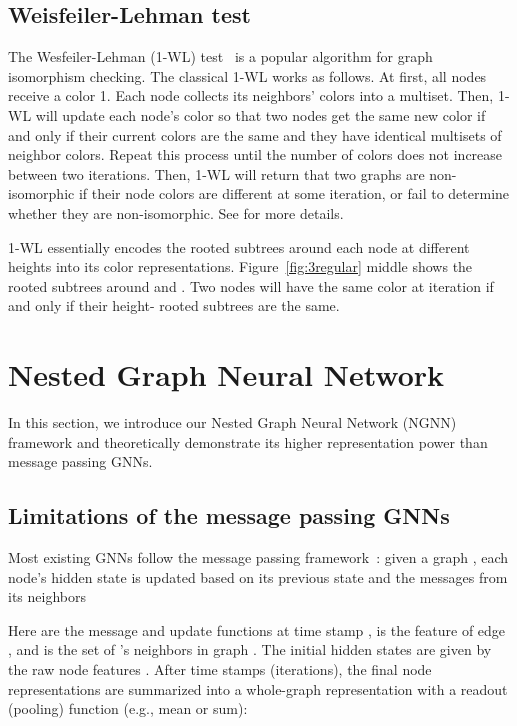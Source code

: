 \documentclass{article}
\begin{document}
\subsection{Weisfeiler-Lehman test}
The Wesfeiler-Lehman (1-WL) test~\citep{weisfeiler1968reduction} is a popular algorithm for graph isomorphism checking. The classical 1-WL works as follows. At first, all nodes receive a color 1. Each node collects its neighbors' colors into a multiset. Then, 1-WL will update each node's color so that two nodes get the same new color if and only if their current colors are the same and they have identical multisets of neighbor colors. Repeat this process until the number of colors does not increase between two iterations. Then, 1-WL will return that two graphs are non-isomorphic if their node colors are different at some iteration, or fail to determine whether they are non-isomorphic. See \citep{shervashidze2011weisfeiler,zhang2017weisfeiler} for more details.

1-WL essentially encodes the rooted subtrees around each node at different heights into its color representations. Figure~\ref{fig:3regular} middle shows the rooted subtrees around  and . Two nodes will have the same color at iteration  if and only if their height- rooted subtrees are the same.



\section{Nested Graph Neural Network}
In this section, we introduce our Nested Graph Neural Network (NGNN) framework and theoretically demonstrate its higher representation power than message passing GNNs. 



\subsection{Limitations of the message passing GNNs}
Most existing GNNs follow the message passing framework~\citep{gilmer2017neural}: given a graph , each node's hidden state  is updated based on its previous state  and the messages  from its neighbors

Here  are the message and update functions at time stamp ,  is the feature of edge , and  is the set of 's neighbors in graph . The initial hidden states  are given by the raw node features . After  time stamps (iterations), the final node representations  are summarized into a whole-graph representation with a readout (pooling) function  (e.g., mean or sum):
\end{document}
